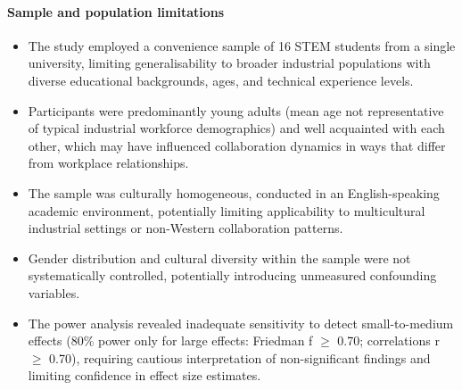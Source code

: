 \paragraph{Sample and population limitations}
\begin{itemize}
    \item The study employed a convenience sample of 16 STEM students from a single university, limiting generalisability to broader industrial populations with diverse educational backgrounds, ages, and technical experience levels.
    \item Participants were predominantly young adults (mean age not representative of typical industrial workforce demographics) and well acquainted with each other, which may have influenced collaboration dynamics in ways that differ from workplace relationships.
    \item The sample was culturally homogeneous, conducted in an English-speaking academic environment, potentially limiting applicability to multicultural industrial settings or non-Western collaboration patterns.
    \item Gender distribution and cultural diversity within the sample were not systematically controlled, potentially introducing unmeasured confounding variables.
    \item The power analysis revealed inadequate sensitivity to detect small-to-medium effects (80\% power only for large effects: Friedman f $\geq$ 0.70; correlations r $\geq$ 0.70), requiring cautious interpretation of non-significant findings and limiting confidence in effect size estimates.
\end{itemize}

